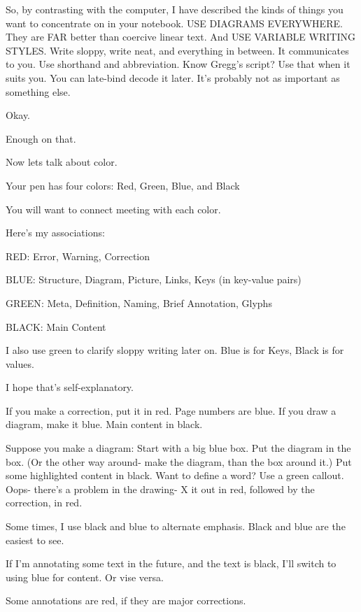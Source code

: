 \documentclass[oneside]{book}
\begin{document}
So, by contrasting with the computer, I have described the kinds of
things you want to concentrate on in your notebook. USE DIAGRAMS
EVERYWHERE. They are FAR better than coercive linear text. And USE
VARIABLE WRITING STYLES. Write sloppy, write neat, and everything in
between. It communicates to you. Use shorthand and abbreviation. Know
Gregg's script? Use that when it suits you. You can late-bind decode
it later. It's probably not as important as something else.

Okay.

Enough on that.

Now lets talk about color.

Your pen has four colors: Red, Green, Blue, and Black

You will want to connect meeting with each color.

Here's my associations:

\begin{description}
\item{RED}:     Error, Warning, Correction
\item{BLUE}:    Structure, Diagram, Picture, Links, Keys (in key-value pairs)
\item{GREEN}:   Meta, Definition, Naming, Brief Annotation, Glyphs
\item{BLACK}:   Main Content
\end{description}

I also use green to clarify sloppy writing later on.
Blue is for Keys, Black is for values.

I hope that's self-explanatory.

If you make a correction, put it in red. Page numbers are blue. If you
draw a diagram, make it blue. Main content in black.

Suppose you make a diagram: Start with a big blue box. Put the diagram
in the box. (Or the other way around- make the diagram, than the box
around it.) Put some highlighted content in black. Want to define a
word? Use a green callout. Oops- there's a problem in the drawing- X
it out in red, followed by the correction, in red.

Some times, I use black and blue to alternate emphasis. Black and blue
are the easiest to see.

If I'm annotating some text in the future, and the text is black, I'll
switch to using blue for content. Or vise versa.

Some annotations are red, if they are major corrections.
\end{document}
